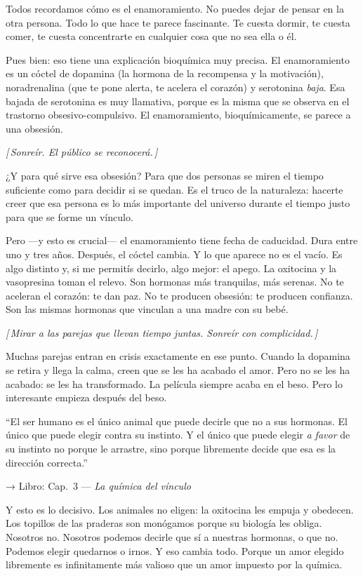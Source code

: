 \documentclass[a4paper, 11pt]{article}
\newcommand{\reflibro}[1]{%
  {\small\sffamily\color{gris} → Libro: #1}%
}
\newcommand{\nota}[1]{%
  \par\smallskip
  {\small\itshape\color{oro!80!black} [\,#1\,]}%
  \par\smallskip
}
\begin{document}
Todos recordamos cómo es el enamoramiento. No puedes dejar de pensar en la otra persona. Todo lo que hace te parece fascinante. Te cuesta dormir, te cuesta comer, te cuesta concentrarte en cualquier cosa que no sea ella o él.

Pues bien: eso tiene una explicación bioquímica muy precisa. El enamoramiento es un cóctel de dopamina (la hormona de la recompensa y la motivación), noradrenalina (que te pone alerta, te acelera el corazón) y serotonina \emph{baja}. Esa bajada de serotonina es muy llamativa, porque es la misma que se observa en el trastorno obsesivo-compulsivo. El enamoramiento, bioquímicamente, se parece a una obsesión.

\nota{Sonreír. El público se reconocerá.}

¿Y para qué sirve esa obsesión? Para que dos personas se miren el tiempo suficiente como para decidir si se quedan. Es el truco de la naturaleza: hacerte creer que esa persona es lo más importante del universo durante el tiempo justo para que se forme un vínculo.

Pero ---y esto es crucial--- el enamoramiento tiene fecha de caducidad. Dura entre uno y tres años. Después, el cóctel cambia. Y lo que aparece no es el vacío. Es algo distinto y, si me permitís decirlo, algo mejor: el apego. La oxitocina y la vasopresina toman el relevo. Son hormonas más tranquilas, más serenas. No te aceleran el corazón: te dan paz. No te producen obsesión: te producen confianza. Son las mismas hormonas que vinculan a una madre con su bebé.

\nota{Mirar a las parejas que llevan tiempo juntas. Sonreír con complicidad.}

Muchas parejas entran en crisis exactamente en ese punto. Cuando la dopamina se retira y llega la calma, creen que se les ha acabado el amor. Pero no se les ha acabado: se les ha transformado. La película siempre acaba en el beso. Pero lo interesante empieza después del beso.

\begin{citalibro}
``El ser humano es el único animal que puede decirle que no a sus hormonas. El único que puede elegir contra su instinto. Y el único que puede elegir \emph{a favor} de su instinto no porque le arrastre, sino porque libremente decide que esa es la dirección correcta.''
\end{citalibro}
\reflibro{Cap.\ 3 — \emph{La química del vínculo}}

Y esto es lo decisivo. Los animales no eligen: la oxitocina les empuja y obedecen. Los topillos de las praderas son monógamos porque su biología les obliga. Nosotros no. Nosotros podemos decirle que sí a nuestras hormonas, o que no. Podemos elegir quedarnos o irnos. Y eso cambia todo. Porque un amor elegido libremente es infinitamente más valioso que un amor impuesto por la química.
\end{document}
